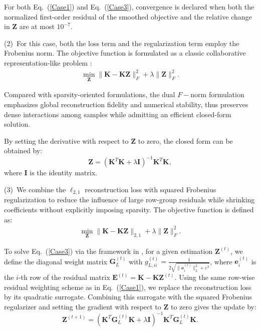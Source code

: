 \documentclass[ASNA,twocolumn]{USG} %
\begin{document}
For both Eq.~(\ref{Case1}) and Eq.~(\ref{Case3}), convergence is declared when both the normalized first-order residual of the smoothed objective and the relative change in $\boldsymbol Z$ are at most $10^{-7}$.

(2)~For this case, both the loss term and the regularization term employ the Frobenius norm. The objective function is formulated as a classic collaborative representation-like problem \cite{zhang2011sparse}:
\begin{eqnarray}\label{Case2}
	\min_{\boldsymbol{Z}}\|\boldsymbol{K}-\boldsymbol{K}\boldsymbol{Z}\|_{F}^2+\lambda\|\boldsymbol{Z}\|_{F}^2.
\end{eqnarray}

Compared with sparsity-oriented formulations, the dual $F-$norm formulation emphasizes global reconstruction fidelity and numerical stability, thus preserves dense interactions among samples while admitting an efficient closed-form solution.

By setting the derivative with respect to $\boldsymbol{Z}$ to zero, the closed form can be obtained by:
\begin{equation} \label{Case2_solve}
    \boldsymbol{Z}=\left(\boldsymbol{K}^T \boldsymbol{K}+\lambda \boldsymbol{I}\right)^{-1} \boldsymbol{K}^T \boldsymbol{K},
\end{equation}
where $\boldsymbol{I}$ is the identity matrix.

(3)~We combine the $\ell_{2,1}$ reconstruction loss with squared Frobenius regularization to reduce the influence of large row-group residuals while shrinking coefficients without explicitly imposing sparsity. The objective function is defined as:
\begin{eqnarray}\label{Case3}
	\min_{\boldsymbol{Z}}\|\boldsymbol{K}-\boldsymbol{K}\boldsymbol{Z}\|_{2,1}+\lambda\|\boldsymbol{Z}\|_{F}^2.
\end{eqnarray}

To solve Eq.~(\ref{Case3}) via the framework in \cite{nie2010efficient}, for a given estimation $\boldsymbol{Z}^{(t)}$, we define the diagonal weight matrix $\boldsymbol{G}_L^{(t)}$ with $g_{L,ii}^{(t)} = \frac{1}{2\sqrt{\|\boldsymbol e_i^{(t)}\|_2^2+\varepsilon^2}}$, where $\boldsymbol{e}_i^{(t)}$ is the $i$-th row of the residual matrix $\boldsymbol{E}^{(t)} = \boldsymbol{K} - \boldsymbol{K}\boldsymbol{Z}^{(t)}$. Using the same row-wise residual weighting scheme as in Eq.~(\ref{Case1}), we replace the reconstruction loss by its quadratic surrogate. Combining this surrogate with the squared Frobenius regularizer and setting the gradient with respect to $\boldsymbol{Z}$ to zero gives the update by:
\begin{equation}
    \boldsymbol{Z}^{(t+1)} = \left( \boldsymbol{K}^T \boldsymbol{G}_L^{(t)} \boldsymbol{K} + \lambda \boldsymbol{I} \right)^{-1} \boldsymbol{K}^T \boldsymbol{G}_L^{(t)} \boldsymbol{K}.
\end{equation}
\end{document}
